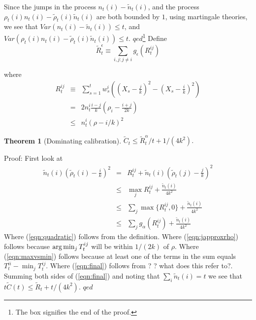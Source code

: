 \documentclass{book}
\newtheorem{theorem}{Theorem}[chapter]
\newcommand{\notes}{\index{personal notes}}
\begin{document}
 Since the jumps in the process $n_t(i) - \tilde{n}_t(i)$, and
the process $\rho_t(i)n_t(i) - \tilde{\rho}_t(i)\tilde{n}_t(i)$ are
both bounded by $1$, using martingale theories, we see that
$Var(n_t(i) - \tilde{n}_t(i)) \le t$, and $Var\left(\rho_t(i)n_t(i) -
\tilde{\rho}_t(i)\tilde{n}_t(i)\right) \le t$.  \hfill
$qed$\footnote{The box signifies the end of the proof.}
\label{def:Box}
Define
\begin{equation} 
  \tilde{R}^\epsilon_t \equiv \sum_{i,j:j \neq i} g_\epsilon(R^{ij}_t) 
\end{equation}

where
\begin{eqnarray*}
    R^{ij}_t &\equiv& \sum_{s=1}^t w^i_s \left(\left(X_s -
    \frac{j}{k}\right)^2  -\left(X_s - \frac{i}{k}\right)^2 \right) \\
 & = & 2 n^i_t\frac{i-j}{k}(\rho_i - \frac{i+j}{2k}) \\
& \le & n^i_t (\rho - i/k)^2
  \end{eqnarray*}
  

 \begin{theorem}[Dominating calibration] $\tilde{C}_t \le
    \tilde{R}_t^\alpha/t + 1/(4k^2)$.
 \end{theorem}

Proof:  First look at
\begin{eqnarray} %
  \displaystyle
  \tilde{n}_t(i) \left(\tilde{\rho}_t(i) - \frac{i}{k}\right)^2& = &
        R^{ij}_t + \tilde{n}_t(i)  \left(\tilde{\rho}_t(j)
        - \frac{j}{k} \right)^2 \label{eqn:quadratic}\\ 
%
 & \le &  \max_{j} R^{ij}_t + \frac{\tilde{n}_t(i)}{4k^2}
\label{eqn:japproxrho}\\ 
%
  & \le & \sum_j \max\{R^{ij}_t,0\} +
  \frac{\tilde{n}_t(i)}{4k^2} \label{eqn:maxvsmin} \\ 
%
  & \le & \sum_j g_\alpha(R^{ij}_t) +
  \frac{\tilde{n}_t(i)}{4k^2}  \label{eqn:final}
\end{eqnarray} 
Where (\ref{eqn:quadratic}) follows from the definition.  Where
(\ref{eqn:japproxrho}) follows because $\hbox{arg}\min_{j} T^{ij}_t$
will be within $1/(2k)$ of $\rho$.  Where (\ref{eqn:maxvsmin}) follows
because at least one of the terms in the sum equals $T^{ii}_t -
\min_{j} T^{ij}_t$.  Where (\ref{eqn:final}) follows from ? ? {\notes
  what does this refer to?}.  Summing both sides of (\ref{eqn:final})
and noting that $\sum_i \tilde{n}_t(i) = t$ we see that $t\tilde{C}(t)
\le \tilde{R}_t + t/(4k^2)$. \hfill $qed$
\end{document}
